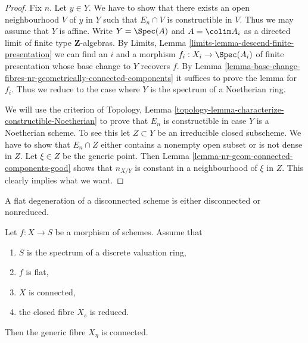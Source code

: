 \begin{proof}
Fix $n$. Let $y \in Y$. We have to show that there exists an open neighbourhood
$V$ of $y$ in $Y$ such that $E_n \cap V$ is constructible in $V$. Thus we may
assume that $Y$ is affine. Write $Y = \Spec(A)$ and
$A = \colim A_i$ as a directed limit of finite type
$\mathbf{Z}$-algebras. By
Limits, Lemma \ref{limits-lemma-descend-finite-presentation}
we can find an $i$ and a morphism $f_i : X_i \to \Spec(A_i)$ of
finite presentation whose base change to $Y$ recovers $f$. By
Lemma \ref{lemma-base-change-fibres-nr-geometrically-connected-components}
it suffices to prove the lemma for $f_i$. Thus we reduce to
the case where $Y$ is the spectrum of a Noetherian ring.

\medskip\noindent
We will use the criterion of
Topology, Lemma \ref{topology-lemma-characterize-constructible-Noetherian}
to prove that $E_n$ is constructible in case $Y$ is a Noetherian scheme.
To see this let $Z \subset Y$ be an irreducible closed subscheme.
We have to show that $E_n \cap Z$ either contains a nonempty open subset
or is not dense in $Z$. Let $\xi \in Z$ be the generic point. Then
Lemma \ref{lemma-nr-geom-connected-components-good}
shows that $n_{X/Y}$ is constant in a neighbourhood of $\xi$ in $Z$.
This clearly implies what we want.
\end{proof}

\begin{lemma}
\label{lemma-connected-flat-over-dvr}
\begin{slogan}
A flat degeneration of a disconnected scheme is either disconnected
or nonreduced.
\end{slogan}
Let $f : X \to S$ be a morphism of schemes.
Assume that
\begin{enumerate}
\item $S$ is the spectrum of a discrete valuation ring,
\item $f$ is flat,
\item $X$ is connected,
\item the closed fibre $X_s$ is reduced.
\end{enumerate}
Then the generic fibre $X_\eta$ is connected.
\end{lemma}

